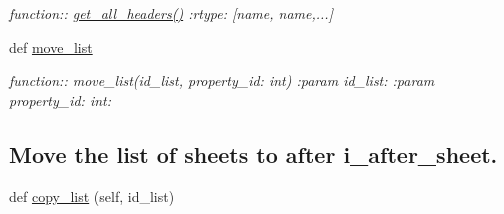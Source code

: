 \begin{DoxyCompactItemize}
\begin{DoxyCompactList}\small\item\em function\+:\+: \hyperlink{classplume-creator_1_1src_1_1plume_1_1data_1_1property_1_1db__property__list_1_1_db_property_list_a7a7edf7adaacb1d694e9f47977cf68a7}{get\+\_\+all\+\_\+headers()} \+:rtype\+: \mbox{[}name, name,...\mbox{]} \end{DoxyCompactList}\item 
def \hyperlink{classplume-creator_1_1src_1_1plume_1_1data_1_1property_1_1db__property__list_1_1_db_property_list_a6f8891fadc3060cac1d029e8eaf4c96a}{move\+\_\+list}
\begin{DoxyCompactList}\small\item\em function\+:\+: move\+\_\+list(id\+\_\+list, property\+\_\+id\+: int) \+:param id\+\_\+list\+: \+:param property\+\_\+id\+: int\+: \subsection*{Move the list of sheets to after i\+\_\+after\+\_\+sheet.}\end{DoxyCompactList}\item 
def \hyperlink{classplume-creator_1_1src_1_1plume_1_1data_1_1property_1_1db__property__list_1_1_db_property_list_a1fcec2294ea6a044adeaccf96ca01ce8}{copy\+\_\+list} (self, id\+\_\+list)\hypertarget{classplume-creator_1_1src_1_1plume_1_1data_1_1property_1_1db__property__list_1_1_db_property_list_a1fcec2294ea6a044adeaccf96ca01ce8}{}\label{classplume-creator_1_1src_1_1plume_1_1data_1_1property_1_1db__property__list_1_1_db_property_list_a1fcec2294ea6a044adeaccf96ca01ce8}


\end{DoxyCompactItemize}
